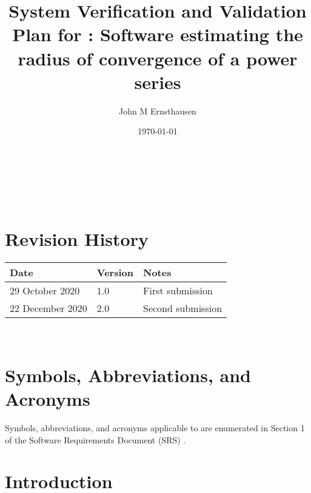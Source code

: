 \documentclass[12pt, titlepage]{article}
\begin{document}
\title{System Verification and Validation Plan for :
Software estimating the radius of convergence of a power series} 
\author{John M Ernsthausen}
\date{\today}
	
\maketitle

~\newpage


\tableofcontents



~\newpage

\section*{Revision History}

\begin{tabularx}{\textwidth}{p{4cm}p{2cm}X}
\toprule {\bf Date} & {\bf Version} & {\bf Notes}\\
\midrule
29 October 2020 & 1.0 & First submission\\
22 December 2020 & 2.0 & Second submission\\
\bottomrule
\end{tabularx}

~\newpage

\section{Symbols, Abbreviations, and Acronyms}

Symbols, abbreviations, and acronyms applicable to  are enumerated
in Section 1 of the Software Requirements Document (SRS) \citep{SRS}.

\newpage


% 
% 
% 
% 
%  

\section{Introduction} \label{sc:introduction}
\end{document}
